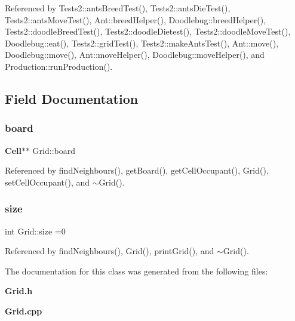 Referenced by Tests2\+::ants\+Breed\+Test(), Tests2\+::ants\+Die\+Test(), Tests2\+::ants\+Move\+Test(), Ant\+::breed\+Helper(), Doodlebug\+::breed\+Helper(), Tests2\+::doodle\+Breed\+Test(), Tests2\+::doodle\+Dietest(), Tests2\+::doodle\+Move\+Test(), Doodlebug\+::eat(), Tests2\+::grid\+Test(), Tests2\+::make\+Ants\+Test(), Ant\+::move(), Doodlebug\+::move(), Ant\+::move\+Helper(), Doodlebug\+::move\+Helper(), and Production\+::run\+Production().



\subsection{Field Documentation}
\mbox{\label{classGrid_ad145c4ee2915bc23093edaa5129fb2b7}} 
\subsubsection{board}
{\footnotesize\ttfamily \textbf{ Cell}$\ast$$\ast$ Grid\+::board}



Referenced by find\+Neighbours(), get\+Board(), get\+Cell\+Occupant(), Grid(), set\+Cell\+Occupant(), and $\sim$\+Grid().

\mbox{\label{classGrid_a001848b23a2ded13a658a405752d388e}} 
\subsubsection{size}
{\footnotesize\ttfamily int Grid\+::size =0}



Referenced by find\+Neighbours(), Grid(), print\+Grid(), and $\sim$\+Grid().



The documentation for this class was generated from the following files\+:\begin{DoxyCompactItemize}
\item 
\textbf{ Grid.\+h}\item 
\textbf{ Grid.\+cpp}\end{DoxyCompactItemize}
